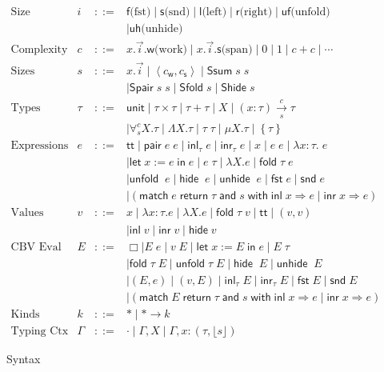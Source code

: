 \documentclass[preprint]{sigplanconf}
\newcommand{\thide}[1]{\left \{ #1 \right \}}
\newcommand{\arrow}[4]{#1\xrightarrow[#3]{#2}#4}
\newcommand{\symlet}{\mathsf{let\;}}
\newcommand{\symin}{\mathsf{\;in\;}}
\newcommand{\symand}{\mathsf{\;and\;}}
\newcommand{\symmatch}{\mathsf{match}}
\newcommand{\symwith}{\mathsf{\;with\;}}
\newcommand{\symreturn}{\mathsf{\;return\;}}
\newcommand{\syminl}{\mathsf{inl}}
\newcommand{\syminr}{\mathsf{inr}}
\newcommand{\symfold}{\mathsf{fold\;}}
\newcommand{\symSfold}{\mathsf{Sfold}}
\newcommand{\symunfold}{\mathsf{unfold\;}}
\newcommand{\symhide}{\mathsf{hide\;}}
\newcommand{\symShide}{\mathsf{Shide}}
\newcommand{\symunhide}{\mathsf{unhide\;}}
\newcommand{\sympair}{\mathsf{pair}}
\newcommand{\symtt}{\mathsf{tt}}
\newcommand{\symunit}{\mathsf{unit}}
\newcommand{\intro}[2]{(#1 : #2)}
\newcommand{\symfst}{\mathsf{fst}}
\newcommand{\symsnd}{\mathsf{snd}}
\newcommand{\symuf}{\mathsf{uf}}
\newcommand{\symuh}{\mathsf{uh}}
\newcommand{\syml}{\mathsf{l}}
\newcommand{\symr}{\mathsf{r}}
\newcommand{\symf}{\mathsf{f}}
\newcommand{\syms}{\mathsf{s}}
\newcommand{\symSpair}{\mathsf{Spair}}
\newcommand{\symSlr}{\mathsf{Ssum}}
\newcommand{\symwork}{\mathsf{w}}
\newcommand{\symspan}{\mathsf{s}}
\newcommand{\Sstats}[1]{\left \langle #1 \right \rangle}
\newcommand{\optional}[1]{\lfloor #1 \rfloor}
\begin{document}
\begin{figure}
$$\begin{array}{rrcl}
  \textrm{Size Subpart Idx} & i &::=& \symf \textrm{(fst)} \mid \syms \textrm{(snd)} \mid \syml \textrm{(left)} \mid \symr \textrm{(right)} \mid \symuf \textrm{(unfold)} \\
  & & & \mid \symuh \textrm{(unhide)} \\
  \textrm{Complexity Expr} & c &::=& x.\vec{i}.\symwork \textrm{(work)} \mid x.\vec{i}.\symspan \textrm{(span)} \mid 0 \mid 1 \mid c+c \mid \cdots \\
  \textrm{Sizes} & s &::=& x.\vec{i} \mid \Sstats{c_\symwork,c_\symspan} \mid \symSlr\;s\;s \\
  & & & \mid \symSpair\;s\;s \mid \symSfold\;s \mid \symShide\;s \\
  \textrm{Types} & \tau &::=& \symunit \mid \tau\times\tau \mid \tau+\tau \mid X \mid \arrow{\intro{x}{\tau}}{c}{s}{\tau} \\
  & & & \mid \forall^c_s X.\tau \mid \Lambda X.\tau \mid \tau\;\tau \mid \mu X.\tau \mid \thide\tau \\
  \textrm{Expressions} & e &::=& \symtt \mid \sympair\;e\;e \mid \syminl_\tau\;e \mid \syminr_\tau\;e \mid x \mid e\;e \mid \lambda x:\tau.\;e \\
  & & & \mid \symlet x := e \symin e \mid e\;\tau \mid \lambda X.e \mid \symfold\tau\;e \\
  & & & \mid \symunfold\;e \mid \symhide\;e \mid \symunhide\;e \mid \symfst\;e \mid \symsnd\;e \\
  & & & \mid (\symmatch\;e \symreturn \tau \symand s \symwith\syminl\;x\Rightarrow e\;|\;\syminr\;x\Rightarrow e) \\
  \textrm{Values} & v &::=& x \mid \lambda x:\tau.e \mid \lambda X.e \mid \symfold\tau\;v \mid \symtt \mid (v,v) \\
  & & & \mid \syminl\;v \mid \syminr\;v \mid \symhide v \\
  \textrm{CBV Eval Ctx} & E &::=& \Box \mid E\;e \mid v\;E \mid \symlet x := E\symin e \mid E\;\tau \\
  & & & \mid \symfold\tau\;E \mid \symunfold\tau\;E \mid \symhide\;E \mid \symunhide\;E \\
  & & & \mid (E, e) \mid (v, E) \mid \syminl_\tau\;E \mid \syminr_\tau\;E \mid \symfst\;E \mid \symsnd\;E \\
  & & & \mid (\symmatch\;E\symreturn \tau \symand s \symwith\syminl\;x\Rightarrow e\;|\;\syminr\;x\Rightarrow e) \\
  \textrm{Kinds} & k &::=& * \mid *\to k \\
  \textrm{Typing Ctx} & \Gamma &::=& \cdot \mid \Gamma,X \mid \Gamma, x:(\tau, \optional{s})
\end{array}$$
\caption{\label{syntax}Syntax}
\end{figure}
\end{document}
